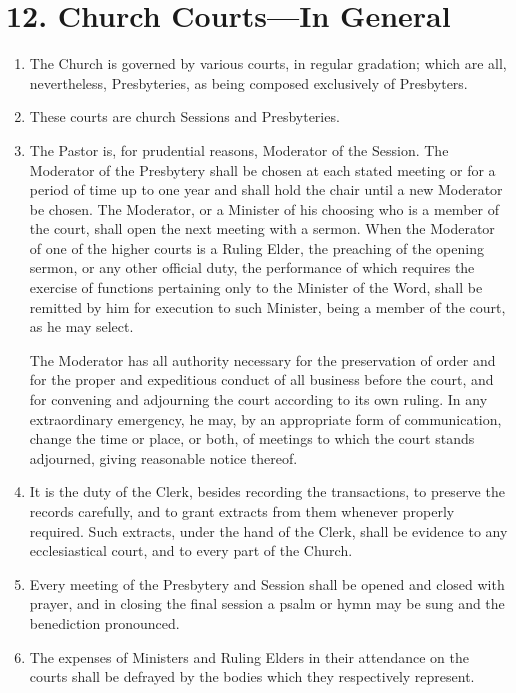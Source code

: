 \documentclass[
]{book}
\begin{document}
\hypertarget{church-courtsin-general}{%
\section*{12. Church Courts---In General}\label{church-courtsin-general}}

\protect\hypertarget{chapter-slug-12-church-courts-in-general}{\href{}{}}

\begin{enumerate}
\def\labelenumi{\arabic{enumi}.}
\item
  \protect\hypertarget{12}{\href{}{}}The Church is governed by various courts, in regular gradation; which are all, nevertheless, Presbyteries, as being composed exclusively of Presbyters.
\item
  These courts are church Sessions and Presbyteries.
\item
  The Pastor is, for prudential reasons, Moderator of the Session. The Moderator of the Presbytery shall be chosen at each stated meeting or for a period of time up to one year and shall hold the chair until a new Moderator be chosen. The Moderator, or a Minister of his choosing who is a member of the court, shall open the next meeting with a sermon. When the Moderator of one of the higher courts is a Ruling Elder, the preaching of the opening sermon, or any other official duty, the performance of which requires the exercise of functions pertaining only to the Minister of the Word, shall be remitted by him for execution to such Minister, being a member of the court, as he may select.

  The Moderator has all authority necessary for the preservation of order and for the proper and expeditious conduct of all business before the court, and for convening and adjourning the court according to its own ruling. In any extraordinary emergency, he may, by an appropriate form of communication, change the time or place, or both, of meetings to which the court stands adjourned, giving reasonable notice thereof.
\item
  It is the duty of the Clerk, besides recording the transactions, to preserve the records carefully, and to grant extracts from them whenever properly required. Such extracts, under the hand of the Clerk, shall be evidence to any ecclesiastical court, and to every part of the Church.
\item
  Every meeting of the Presbytery and Session shall be opened and closed with prayer, and in closing the final session a psalm or hymn may be sung and the benediction pronounced.
\item
  The expenses of Ministers and Ruling Elders in their attendance on the courts shall be defrayed by the bodies which they respectively represent.
\end{enumerate}
\end{document}

